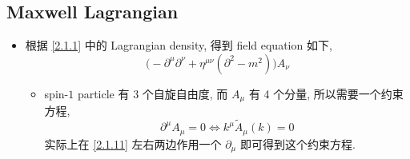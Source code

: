 \subsection{Maxwell Lagrangian} \label{subsection 2.1.2}
\begin{itemize}
	\item 根据 \eqref{2.1.1} 中的 Lagrangian density, 得到 field equation 如下,
	\begin{equation} \label{2.1.11}
		\Big( - \partial^\mu \partial^\nu + \eta^{\mu \nu} (\partial^2 - m^2) \Big) A_\nu
	\end{equation}
	\begin{itemize}
		\item spin-$1$ particle 有 3 个自旋自由度, 而 $A_\mu$ 有 4 个分量, 所以需要一个约束方程,
		\begin{equation}
			\partial^\mu A_\mu = 0 \iff k^\mu \tilde{A}_\mu(k) = 0
		\end{equation}
		实际上在 \eqref{2.1.11} 左右两边作用一个 $\partial_\mu$ 即可得到这个约束方程.
	\end{itemize}
\end{itemize}

